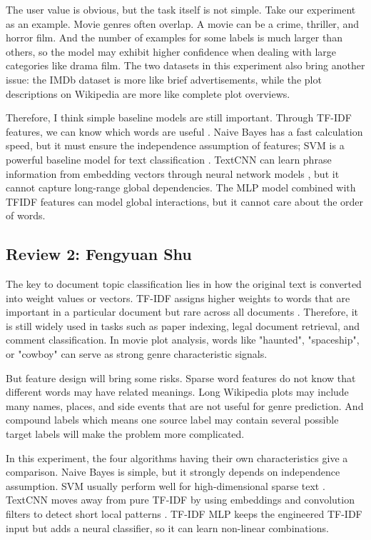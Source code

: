 \documentclass[12pt,a4paper]{article}
\begin{document}
The user value is obvious, but the task itself is not simple. Take our experiment as an example. Movie genres often overlap. A movie can be a crime, thriller, and horror film. And the number of examples for some labels is much larger than others, so the model may exhibit higher confidence when dealing with large categories like drama film. The two datasets in this experiment also bring another issue: the IMDb dataset is more like brief advertisements, while the plot descriptions on Wikipedia are more like complete plot overviews.

Therefore, I think simple baseline models are still important. Through TF-IDF features, we can know which words are useful \cite{ramos2003}. Naive Bayes has a fast calculation speed, but it must ensure the independence assumption of features; SVM is a powerful baseline model for text classification \cite{joachims1998}. TextCNN can learn phrase information from embedding vectors through neural network models \cite{kim2014cnn}, but it cannot capture long-range global dependencies. The MLP model combined with TFIDF features can model global interactions, but it cannot care about the order of words.

\subsection{Review 2: Fengyuan Shu}
The key to document topic classification lies in how the original text is converted into weight values or vectors. TF-IDF assigns higher weights to words that are important in a particular document but rare across all documents \cite{ramos2003}. Therefore, it is still widely used in tasks such as paper indexing, legal document retrieval, and comment classification. In movie plot analysis, words like "haunted", "spaceship", or "cowboy" can serve as strong genre characteristic signals.

But feature design will bring some risks. Sparse word features do not know that different words may have related meanings. Long Wikipedia plots may include many names, places, and side events that are not useful for genre prediction. And compound labels which means one source label may contain several possible target labels will make the problem more complicated.

In this experiment, the four algorithms having their own characteristics give a comparison. Naive Bayes is simple, but it strongly depends on independence assumption. SVM usually perform well for high-dimensional sparse text \cite{cortes1995svm,joachims1998}. TextCNN moves away from pure TF-IDF by using embeddings and convolution filters to detect short local patterns \cite{kim2014cnn}. TF-IDF MLP keeps the engineered TF-IDF input but adds a neural classifier, so it can learn non-linear combinations.
\end{document}
